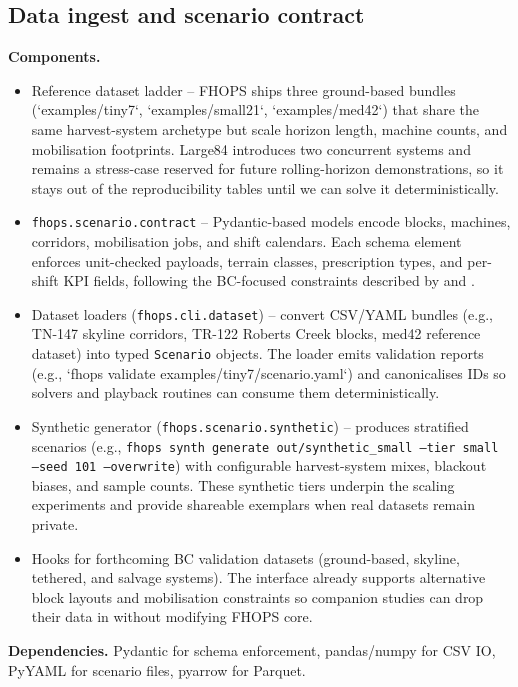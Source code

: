 

\subsection{Data ingest and scenario contract}
\textbf{Components.}
\begin{itemize}
  \item Reference dataset ladder – FHOPS ships three ground-based bundles (`examples/tiny7`, `examples/small21`, `examples/med42`) that share the same harvest-system archetype but scale horizon length, machine counts, and mobilisation footprints. Large84 introduces two concurrent systems and remains a stress-case reserved for future rolling-horizon demonstrations, so it stays out of the reproducibility tables until we can solve it deterministically.
  \item \texttt{fhops.scenario.contract} – Pydantic-based models encode blocks, machines, corridors, mobilisation jobs, and shift calendars. Each schema element enforces unit-checked payloads, terrain classes, prescription types, and per-shift KPI fields, following the BC-focused constraints described by \cite{lahrsen2022productivity} and \cite{becker2018lidar}.
  \item Dataset loaders (\texttt{fhops.cli.dataset}) – convert CSV/YAML bundles (e.g., TN-147 skyline corridors, TR-122 Roberts Creek blocks, med42 reference dataset) into typed \texttt{Scenario} objects. The loader emits validation reports (e.g., `fhops validate examples/tiny7/scenario.yaml`) and canonicalises IDs so solvers and playback routines can consume them deterministically.
  \item Synthetic generator (\texttt{fhops.scenario.synthetic}) – produces stratified scenarios (e.g., \texttt{fhops synth generate out/synthetic\_small --tier small --seed 101 --overwrite}) with configurable harvest-system mixes, blackout biases, and sample counts. These synthetic tiers underpin the scaling experiments and provide shareable exemplars when real datasets remain private.
  \item Hooks for forthcoming BC validation datasets (ground-based, skyline, tethered, and salvage systems). The interface already supports alternative block layouts and mobilisation constraints so companion studies can drop their data in without modifying FHOPS core.
\end{itemize}

\textbf{Dependencies.} Pydantic for schema enforcement, pandas/numpy for CSV IO, PyYAML for scenario files, pyarrow for Parquet.

